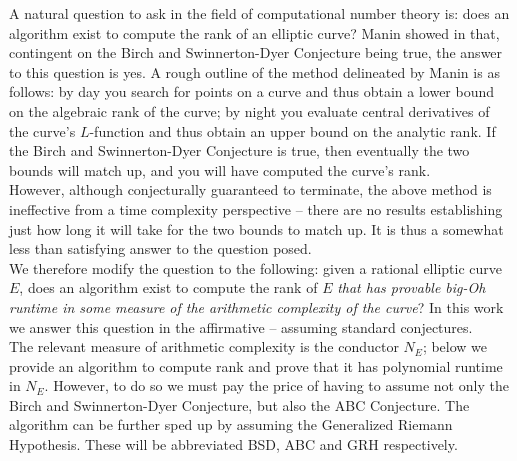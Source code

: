 
A natural question to ask in the field of computational number theory is: does an algorithm exist to compute the rank of an elliptic curve? Manin showed in \cite{Man-1971} that, contingent on the Birch and Swinnerton-Dyer Conjecture being true, the answer to this question is yes. A rough outline of the method delineated by Manin is as follows: by day you search for points on a curve and thus obtain a lower bound on the algebraic rank of the curve; by night you evaluate central derivatives of the curve's $L$-function and thus obtain an upper bound on the analytic rank. If the Birch and Swinnerton-Dyer Conjecture is true, then eventually the two bounds will match up, and you will have computed the curve's rank. \\

However, although conjecturally guaranteed to terminate, the above method is ineffective from a time complexity perspective -- there are no results establishing just how long it will take for the two bounds to match up. It is thus a somewhat less than satisfying answer to the question posed. \\

We therefore modify the question to the following: given a rational elliptic curve $E$, does an algorithm exist to compute the rank of $E$ {\it that has provable big-Oh runtime in some measure of the arithmetic complexity of the curve}? In this work we answer this question in the affirmative -- assuming standard conjectures. \\

The relevant measure of arithmetic complexity is the conductor $N_E$; below we provide an algorithm to compute rank and prove that it has polynomial runtime in $N_E$. However, to do so we must pay the price of having to assume not only the Birch and Swinnerton-Dyer Conjecture, but also the ABC Conjecture. The algorithm can be further sped up by assuming the Generalized Riemann Hypothesis. These will be abbreviated BSD, ABC and GRH respectively. \\

